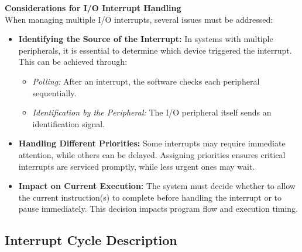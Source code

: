 \textbf{Considerations for I/O Interrupt Handling} \\
When managing multiple I/O interrupts, several issues must be addressed:

\begin{itemize}
    \item \textbf{Identifying the Source of the Interrupt:} In systems with multiple peripherals, it is essential to determine which device triggered the interrupt. This can be achieved through:
    \begin{itemize}
        \item \textit{Polling:} After an interrupt, the software checks each peripheral sequentially.
        \item \textit{Identification by the Peripheral:} The I/O peripheral itself sends an identification signal.
    \end{itemize}

    \item \textbf{Handling Different Priorities:} Some interrupts may require immediate attention, while others can be delayed. Assigning priorities ensures critical interrupts are serviced promptly, while less urgent ones may wait.

    \item \textbf{Impact on Current Execution:} The system must decide whether to allow the current instruction(s) to complete before handling the interrupt or to pause immediately. This decision impacts program flow and execution timing.
\end{itemize}
\newpage
\subsection{Interrupt Cycle Description}

